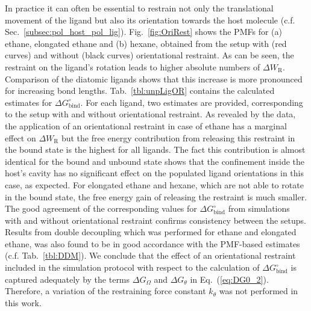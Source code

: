 \documentclass[9pt,lessons]{livecoms}
\begin{document}
In practice it can often be essential to restrain not only the translational movement of the ligand but also its orientation towards the host molecule (c.f. Sec.~\ref{subsec:pol_host_pol_lig}).
Fig.~\ref{fig:OriRest} shows the PMFs for (a) ethane, elongated ethane and (b) hexane, obtained from the setup with (red curves) and without (black curves) orientational restraint.
As can be seen, the restraint on the ligand's rotation leads to higher absolute numbers of $\Delta W_\mathrm{R}$.
Comparison of the diatomic ligands shows that this increase is more pronounced for increasing bond lengths.
Tab.~\ref{tbl:unpLigOR} contains the calculated estimates for $\Delta G^\circ_\mathrm{bind}$. 
For each ligand, two estimates are provided, corresponding to the setup with and without orientational restraint. 
As revealed by the data, the application of an orientational restraint in case of ethane has a marginal effect on $\Delta W_\mathrm{R}$ but the free energy contribution from releasing this restraint in the bound state is the highest for all ligands.
The fact this contribution is almost identical for the bound and unbound state shows that the confinement inside the host's cavity has no significant effect on the populated ligand orientations in this case, as expected.
For elongated ethane and hexane, which are not able to rotate in the bound state, the free energy gain of releasing the restraint is much smaller.
The good agreement of the corresponding values for $\Delta G^\circ_\mathrm{bind}$ from simulations with and without orientational restraint confirms consistency between the setups. 
Results from double decoupling which was performed for ethane and elongated ethane, was also found to be in good accordance with the PMF-based estimates (c.f. Tab.~\ref{tbl:DDM}).
We conclude that the effect of an orientational restraint included in the simulation protocol with respect to the calculation of $\Delta G^\circ_\mathrm{bind}$ is captured adequately by the terms $\Delta G_\Omega$ and 
$\Delta G_\theta$ in Eq.~(\ref{eq:DG0_2}).
Therefore, a variation of the restraining force constant $k_\theta$ was not performed in this work.
\end{document}
